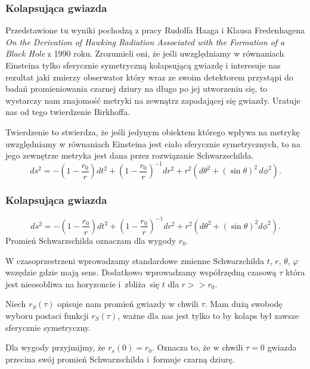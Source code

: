 \documentclass[10pt,t]{beamer}
\begin{document}
\begin{frame}
  \frametitle{Kolapsująca gwiazda}


  Przedstawione tu wyniki pochodzą z pracy Rudolfa Haaga i Klausa
  Fredenhagena \textit{On the Derivation of Hawking Radiation Associated
    with the Formation of a Black Hole} z 1990 roku. Zrozumieli oni,
  że jeśli uwzględniamy w równaniach Einsteina tylko sferycznie
  symetryczną kolapsującą gwiazdę i interesuje nas rezultat jaki
  zmierzy obserwator który wraz ze swoim detektorem przystąpi do badań
  promieniowania czarnej dziury na długo po jej utworzeniu się, to
  wystarczy nam znajomość metryki na zewnątrz zapadającej się gwiazdy.
  Uratuje nas od tego twierdzenie Birkhoffa.

  Twierdzenie to stwierdza, że jeśli jedynym obiektem którego wpływa
  na metrykę uwzględniamy w równaniach Einsteina jest ciało sferycznie
  symetrycznych, to na jego zewnętrze metryka jest dana przez
  rozwiązanie Schwarzschilda.
  \begin{equation}
    \label{eq:Promieniowanie-Hawkinga-19}
    ds^{ 2 } =
    -\left( 1 - \frac{ r_{ 0 } }{ r } \right) dt^{ 2 }
    + \left( 1 - \frac{ r_{ 0 } }{ r } \right)^{ -1 } dr^{ 2 }
    + r^{ 2 } ( d \theta^{ 2 } + ( \sin\theta )^{ 2 } \, d\phi^{ 2 } ).
  \end{equation}

\end{frame}





\begin{frame}
  \frametitle{Kolapsująca gwiazda}

  \vspace{-1em}


  \begin{equation}
    \label{eq:Promieniowanie-Hawkinga-20}
    ds^{ 2 } =
    -\left(1 - \frac{ r_{ 0 } }{ r } \right) dt^{ 2 }
    + \left(1 - \frac{ r_{ 0 } }{ r } \right)^{ -1 } dr^{ 2 }
    + r^{ 2 } ( d \theta^{ 2 } + ( \sin \theta )^{ 2 } d\phi^{ 2 } ).
  \end{equation}
  Promień Schwarzschilda oznaczam dla wygody $r_{ 0 }$.

  W czasoprzestrzeni wprowadzamy standardowe zmienne Schwarzchilda
  $t$, $r$, $\theta$, $\varphi$ wszędzie gdzie mają sens. Dodatkowo wprowadzamy
  współrzędną czasową $\tau$ która jest nieosobliwa na horyzoncie
  i~zbliża~się $t$ dla $r >> r_{ 0 }$.

  Niech $r_{ S }( \tau )$ opisuje nam promień gwiazdy w chwili $\tau$.
  Mam dużą swobodę wyboru postaci funkcji $r_{ S }( \tau )$, ważne dla
  nas jest tylko to by kolaps był zawsze sferycznie symetryczny.

  Dla wygody przyjmijmy, że $r_{ s }( 0 ) = r_{ 0 }$. Oznacza to, że w
  chwili $\tau = 0$ gwiazda przecina swój promień Schwarzschilda i~formuje
  czarną dziurę.

\end{frame}
\end{document}
